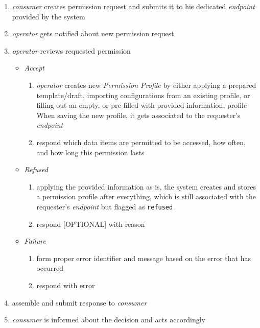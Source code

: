 \documentclass[12pt,english,a4paper,titlepage,cleardoublepage=empty,dottedtoc]{report}
\providecommand{\tightlist}{%
  \setlength{\itemsep}{0pt}\setlength{\parskip}{0pt}}
\begin{document}
\begin{enumerate}
\def\labelenumi{\arabic{enumi}.}
\item
  \emph{consumer} creates permission request and submits it to his
  dedicated \emph{endpoint} provided by the system
\item
  \emph{operator} gets notified about new permission request
\item
  \emph{operator} reviews requested permission

  \begin{itemize}
  \tightlist
  \item
    \emph{Accept}

    \begin{enumerate}
    \def\labelenumii{\arabic{enumii})}
    \tightlist
    \item
      \emph{operator} creates new \emph{Permission Profile} by either
      applying a prepared template/draft, importing configurations from
      an existing profile, or filling out an empty, or pre-filled with
      provided information, profile When saving the new profile, it gets
      associated to the requester's \emph{endpoint}
    \item
      respond which data items are permitted to be accessed, how often,
      and how long this permission lasts
    \end{enumerate}
  \item
    \emph{Refused}

    \begin{enumerate}
    \def\labelenumii{\arabic{enumii})}
    \tightlist
    \item
      applying the provided information as is, the system creates and
      stores a permission profile after everything, which is still
      associated with the requester's \emph{endpoint} but flagged as
      \texttt{refused}
    \item
      respond {[}OPTIONAL{]} with reason
    \end{enumerate}
  \item
    \emph{Failure}

    \begin{enumerate}
    \def\labelenumii{\arabic{enumii})}
    \tightlist
    \item
      form proper error identifier and message based on the error that
      has occurred
    \item
      respond with error
    \end{enumerate}
  \end{itemize}
\item
  assemble and submit response to \emph{consumer}
\item
  \emph{consumer} is informed about the decision and acts accordingly


\end{enumerate}
\end{document}
